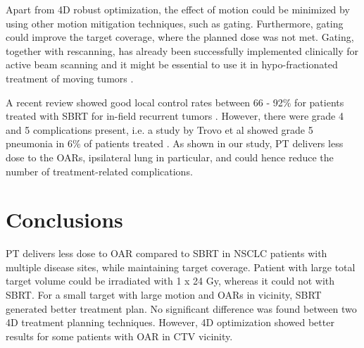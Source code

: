 \documentclass[type=dr, dr=rernat, accentcolor=tud7b,colorbacktitle, bigchapter, openright, twoside, 12pt ]{tudthesis}
\begin{document}
Apart from 4D robust optimization, the effect of motion could be minimized by using other motion mitigation techniques, such as gating. Furthermore, gating could improve the target coverage, where the planned dose was
not met. Gating, together with rescanning, has already been successfully implemented clinically for active beam scanning \cite{Rossi2016, Mori2016} and it might be essential to use it in hypo-fractionated 
treatment of moving tumors \cite{Richter2014}.

A recent review showed good local control rates between 66 - 92\% for patients treated with SBRT for in-field recurrent tumors \cite{Amini2014}. 
However, there were grade 4 and 5 complications present, i.e. a study by Trovo et al showed grade 5 pneumonia in
6\% of patients treated \cite{Trovo2014}. As shown in our study, PT delivers less dose to the OARs, ipsilateral lung in particular, and could hence reduce the number of treatment-related
complications.

\section{Conclusions}

PT delivers less dose to OAR compared to SBRT in NSCLC patients with multiple disease sites, while maintaining target coverage. Patient with large total target volume 
could be irradiated with 1 x 24 Gy, whereas it could not with SBRT. For a small target with large motion and OARs in vicinity, 
SBRT generated better treatment plan. 
No significant difference was found between two 4D treatment planning techniques. However, 4D optimization showed better results for some patients with OAR in CTV vicinity.



{}
% 
\end{document}
